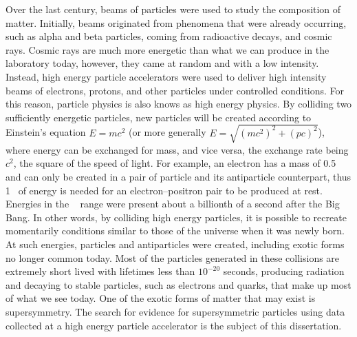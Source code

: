 Over the last century, beams of particles were used to study the 
composition of matter.
Initially, beams originated from phenomena that were 
already occurring, such as alpha and beta particles, coming from radioactive 
decays, and cosmic rays.
Cosmic rays are much more energetic than what we can produce 
in the laboratory today, however, they came at random and 
with a low intensity. Instead, 
high energy particle accelerators were used to deliver high intensity beams of 
electrons, protons, and other particles under controlled conditions.
For this reason, particle physics is also knows as high energy physics.
By colliding two sufficiently energetic particles,  new particles will be created 
according to Einstein's equation $E = mc^2$ (or more generally $E = \sqrt{\left(mc^2\right)^2+\left(pc\right)^2}$),
where energy can be exchanged for mass, and vice versa, the exchange rate being $c^2$, the square of the 
speed of light. For example, an electron has a mass of 0.5 \MeV~ 
and can only be created in a pair of particle and its antiparticle counterpart, thus 
1 \MeV~of energy is needed for an electron--positron pair to be produced at rest.
Energies in the \TeV~ range were present about a billionth of a second after the Big Bang.
In other words, by colliding high energy particles, it is possible to 
recreate momentarily conditions similar to those of the universe when it 
was newly born.
At such energies, particles and antiparticles were created, including 
exotic forms no longer common today.
Most of the particles generated in these collisions are extremely short lived 
with lifetimes less than $10^{-20}$ seconds, 
producing radiation and decaying to stable particles, such as electrons and quarks, that make up most of what we see today.
One of the exotic forms of matter that may exist is supersymmetry.
The search for evidence for supersymmetric particles using data collected at a
high energy particle accelerator is the subject of this dissertation.

